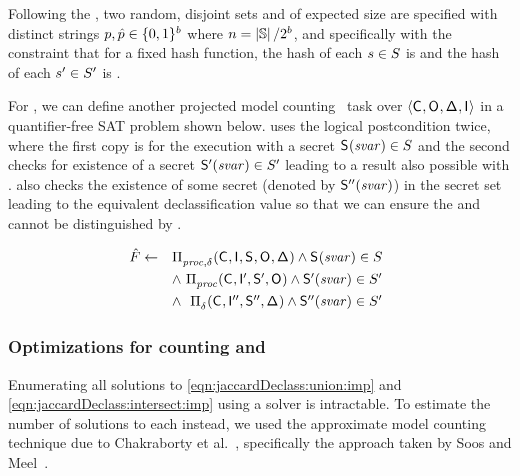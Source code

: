 Following the , two random,
disjoint sets \secretsSet{} and \secretsSetAlt{} of expected size
\secretsSetSize are specified with distinct strings
$p, \hat{p} \in
\{0,1\}^b$ where $n =
\left|{\mathbb{S}}\right|/2^b$, and specifically
with the constraint that for a fixed hash function, the hash of each
$s \in S_{}$ is \hashFnOutputPrefix and the hash of
each $s' \in S_{}'$ is \hashFnOutputPrefixAlt.

For
\possibleTriplesIntersectWithDeclass{\secretsSet{}}{\secretsSetAlt{}},
we can define another projected model
counting~\cite{projectedmodelcount} task over $\langle\mathsf{C}_{},
\mathsf{O}_{}, \mathsf{\Delta}_{}, \mathsf{I}_{}\rangle$ in a quantifier-free SAT problem
\satPropIntersect shown below.  \satPropIntersect uses the logical
postcondition \postcondition{\proc}{} twice, where the first copy is
for the execution with a secret $\mathsf{S}_{}(\mathit{svar}) \in S_{}$
and the second checks for existence of a secret $\mathsf{S}'_{}(\mathit{svar})
\in S_{}'$ leading to a result \AOOFn{} also possible with
\SecFn{}.  \satPropIntersect also checks the existence of some secret
(denoted by $\mathsf{S}''_{}(\mathit{svar})$) in the secret set
\secretsSetAlt{} leading to the equivalent declassification value
\DCFn{} so that we can ensure the \SecFn{} and \SecFnAlt{} cannot be
distinguished by \DCFn{}.

\begin{align}
\begin{array}{@{}rr}
\satPropIntersect\leftarrow
&\postcondition{\proc,\declassify{}}{}(\ACIFn{},\AIIFn{},\SecFn{},
\AOOFn{}, \DCFn{})
\wedge 
\SecFn{}(\SecVar) \in \secretsSet{} \\[4pt]
&\wedge~\hfill
\postcondition{\proc}{}(\ACIFn{}, \AIIFnAlt{}, \SecFnAlt{}, \AOOFn{}) 
\wedge
\SecFnAlt{}(\SecVar) \in\secretsSetAlt{} \\[4pt]
& \wedge~\hfill
\postcondition{\declassify{}}{}(\ACIFn{}, \AIIFnAltAlt{},
\SecFnAltAlt{}, \DCFn{})
\wedge
\SecFnAltAlt{}(\SecVar)\in\secretsSetAlt{}
\end{array}
\label{eqn:jaccardDeclass:intersect:imp} 
\end{align}

\subsubsection{Optimizations for counting
\possibleTriplesDiffWithDeclass{\secretsSet{}}{\secretsSetAlt{}} and
\possibleTriplesUnionWithDeclass{\secretsSet{}}{\secretsSetAlt{}}}
Enumerating all solutions to \eqref{eqn:jaccardDeclass:union:imp} and
\eqref{eqn:jaccardDeclass:intersect:imp} using a solver is
intractable.  To estimate the number of solutions to each instead, we
used the approximate model counting technique due to Chakraborty et
al.~\cite{Chakraborty:2013:SAM:2961240.2961265}, specifically the
approach taken by Soos and Meel~\cite{SM19}.

